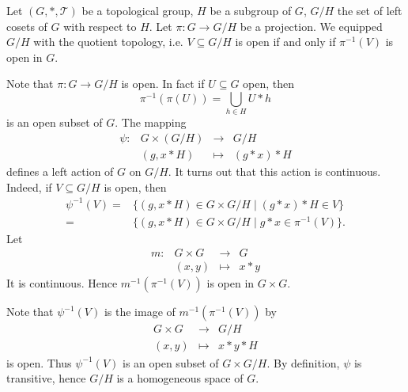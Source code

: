 \begin{exampleenv}
    Let $(G,*,\mathscr{T})$ be a topological group,
    $H$ be a subgroup of $G$,
    $G/H$ the set of left cosets of $G$ with respect to $H$.
    Let $\pi : G \rightarrow G/H$ be a projection.
    We equipped $G/H$ with the quotient topology,
    i.e. $V \subseteq G/H$ is open if and only if $\pi^{-1} (V)$ is open in $G$.

    \quad Note that $\pi : G \rightarrow G/H$ is open.
    In fact if $U \subseteq G$ open, then
    $$ \pi^{-1} \left(\pi(U)\right) = \bigcup_{h \in H} U * h$$
    is an open subset of $G$.
    The mapping
    $$\begin{array}{rrcl}
        \psi : & G \times (G/H) & \longrightarrow & G/H\\
        & (g, x * H) & \longmapsto & (g * x) * H
    \end{array}$$
    defines a left action of $G$ on $G/H$.
    It turns out that this action is continuous.
    Indeed, if $V \subseteq G/H$ is open, then
    $$\begin{aligned}
        \psi^{-1} (V) = & \{(g, x * H) \in G \times G/H \mid (g * x) * H \in V\}\\
        = & \{(g, x * H) \in G \times G/H \mid g * x \in \pi^{-1} (V)\}.
    \end{aligned}$$
    Let
    $$\begin{array}{rrcl}
        m : & G \times G & \longrightarrow & G\\
        & (x,y) & \longmapsto & x * y
    \end{array}$$
    It is continuous.
    Hence $m^{-1} (\pi^{-1} (V))$ is open in $G \times G$.

    \quad Note that $\psi^{-1} (V)$ is the image of $m^{-1}(\pi^{-1} (V))$ by
    $$\begin{array}{rcl}
        G \times G & \longrightarrow & G/H\\
        (x,y) & \longmapsto & x * y * H
    \end{array}$$
    is open.
    Thus $\psi^{-1} (V)$ is an open subset of $G \times G/H$.
    By definition, $\psi$ is transitive, hence $G/H$ is a homogeneous space of $G$.
\end{exampleenv}

